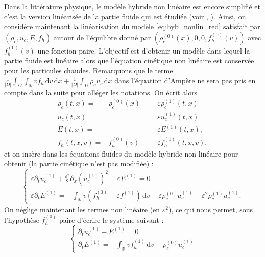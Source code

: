 Dans la littérature physique, le modèle hybride non linéaire est encore simplifié et c'est la version linéarisée de la partie fluide qui est étudiée (voir \cite{Holderied:2019}, \cite{Tronci:2014}). Ainsi, on considère maintenant la linéarisation du modèle \eqref{eq:hyb_nonlin_red} satisfait par $(\rho_c, u_c, E, f_h)$ autour de l'équilibre donné par  $(\rho_c^{(0)}(x), 0, 0, f^{(0)}_h(v))$ avec $f^{(0)}_h(v)$ une fonction paire. L'objectif est d'obtenir un modèle dans lequel la partie fluide est linéaire alors que l'équation cinétique non lin\'eaire  est conservée pour les particules chaudes. Remarquons que le terme $\frac{1}{|\Omega|}\int_\Omega \int_{\mathbb{R}} vf_h\,\mathrm{d}v \,\mathrm{d}x+ \frac{1}{|\Omega|}\int_\Omega \rho_cu_c \,\mathrm{d}x$ dans l'\'equation d'Amp\`ere ne sera pas pris en compte dans la suite pour all\'eger les notations. 
On écrit alors
\begin{equation}
  \begin{aligned}
    \rho_c(t,x) = & \rho_c^{(0)}(x) & + & \varepsilon\rho_c^{(1)}(t,x) \\
    u_c(t,x)    = &                 &   & \varepsilon u_c^{(1)}(t,x) \\
    E(t,x)      = &                 &   & \varepsilon E^{(1)}(t,x), \\
    f_h(t,x, v)   = &  f^{(0)}_h(v)   & + & \varepsilon f_h^{(1)}(t,x,v), 
  \end{aligned}
  \label{eq:lin_variables}
\end{equation}
et on insère dans les équations fluides du modèle hybride non linéaire pour obtenir (la partie cinétique n'est pas modifiée) :
$$
  \begin{cases}
    \varepsilon \partial_t u_c^{(1)}
      + \frac{\varepsilon^2}{2}\partial_x\left(u_c^{(1)}\right)^2
      - \varepsilon E^{(1)} = 0 \\
    \varepsilon\partial_t E^{(1)} = -\int_{\mathbb{R}} v(f_h^{(0)} + \varepsilon f^{(1)} )\,\mathrm{d}v
      - \varepsilon\rho_c^{(0)}u_c^{(1)} - \varepsilon^2\rho_c^{(1)}u_c^{(1)}. 
  \end{cases}
$$
On néglige maintenant  les termes non lin\'eaire (en $\varepsilon^2$), ce qui nous permet, sous l'hypothèse $f_{h}^{(0)}$ paire d'écrire le système suivant :
$$
  \begin{cases}
    \partial_t u_c^{(1)} -  E^{(1)} = 0 \\
    \partial_t E^{(1)} = -\int_{\mathbb{R}} vf^{(1)}_h\,\mathrm{d}v - \rho_c^{(0)}u_c^{(1)}
  \end{cases}
$$
